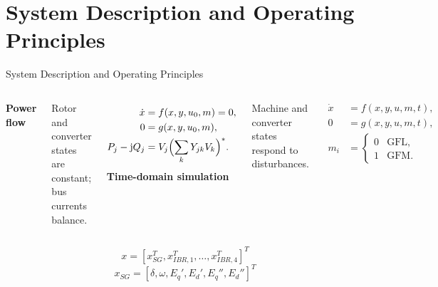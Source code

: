 \documentclass{beamer}
\begin{document}
\section{System Description and Operating Principles}
\begin{frame}{System Description and Operating Principles}
\footnotesize
\begin{columns}[t,onlytextwidth]
\textbf{Power flow}\par
Rotor and converter states are constant; bus currents balance.\par
\begin{align}
\dot x&=f(x,y,u_0,m)=0,\\
0&=g(x,y,u_0,m),\\
P_j-\mathrm jQ_j&=V_j\Bigl(\sum_kY_{jk}V_k\Bigr)^*.
\end{align}
\textbf{Time-domain simulation}\par
Machine and converter states respond to disturbances.\par
\begin{align}
\dot x&=f(x,y,u,m,t),\\
0&=g(x,y,u,m,t),\\
m_i&=\begin{cases}0&\text{GFL},\\1&\text{GFM}.\end{cases}
\end{align}
\end{columns}
\medskip\medskip
\begin{equation}
x=[x_{SG}^{T},x_{IBR,1}^{T},\ldots,x_{IBR,4}^{T}]^T
\end{equation}
\begin{equation}
x_{SG}=[\delta,\omega,E_q',E_d',E_q'',E_d'']^T
\end{equation}
\scriptsize

\end{frame}
\end{document}
